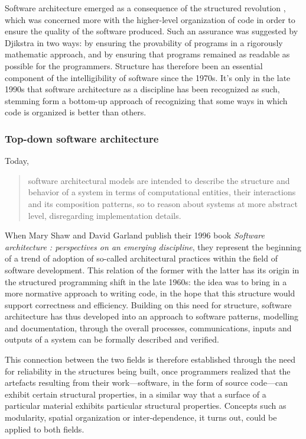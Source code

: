 Software architecture emerged as a consequence of the structured revolution \citep{dijkstra_chapter_1972}, which was concerned more with the higher-level organization of code in order to ensure the quality of the software produced. Such an assurance was suggested by Djikstra in two ways: by ensuring the provability of programs in a rigorously mathematic approach, and by ensuring that programs remained as readable as possible for the programmers. Structure has therefore been an essential component of the intelligibility of software since the 1970s. It's only in the late 1990s that software architecture as a discipline has been recognized as such, stemming form a bottom-up approach of recognizing that some ways in which code is organized is better than others.

\subsubsection{Top-down software architecture}

Today,
\begin{quote}
  software architectural models are intended to describe the structure and behavior of a system in terms of computational entities, their interactions and its composition patterns, so to reason about systems at more abstract  level, disregarding implementation details. \citep{garland_software_2000}
\end{quote}

When Mary Shaw and David Garland publish their 1996 book \emph{Software architecture : perspectives on an emerging discipline}, they represent the beginning of a trend of adoption of so-called architectural practices within the field of software development. This relation of the former with the latter has its origin in the structured programming shift in the late 1960s: the idea was to bring in a more normative approach to writing code, in the hope that this structure would support correctness and efficiency. Building on this need for structure, software architecture has thus developed into an approach to software patterns, modelling and documentation, through the overall processes, communications, inputs and outputs of a system can be formally described and verified.

This connection between the two fields is therefore established through the need for reliability in the structures being built, once programmers realized that the artefacts resulting from their work—software, in the form of source code—can exhibit certain structural properties, in a similar way that a surface of a particular material exhibits particular structural properties. Concepts such as modularity, spatial organization or inter-dependence, it turns out, could be applied to both fields.

